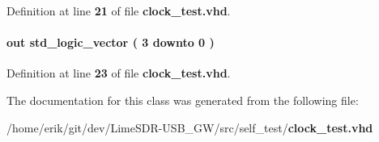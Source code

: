 Definition at line {\bf 21} of file {\bf clock\+\_\+test.\+vhd}.

\paragraph[{test\+\_\+rez}]{ {\bfseries \textcolor{keywordflow}{out}\textcolor{vhdlchar}{ }} {\bfseries \textcolor{comment}{std\+\_\+logic\+\_\+vector}\textcolor{vhdlchar}{ }\textcolor{vhdlchar}{(}\textcolor{vhdlchar}{ }\textcolor{vhdlchar}{ } \textcolor{vhdldigit}{3} \textcolor{vhdlchar}{ }\textcolor{keywordflow}{downto}\textcolor{vhdlchar}{ }\textcolor{vhdlchar}{ } \textcolor{vhdldigit}{0} \textcolor{vhdlchar}{ }\textcolor{vhdlchar}{)}\textcolor{vhdlchar}{ }} \hspace{0.3cm}{\ttfamily [Port]}}\label{classclock__test_ab811e0af67f47ce9b7a1daa7deb1657c}


Definition at line {\bf 23} of file {\bf clock\+\_\+test.\+vhd}.



The documentation for this class was generated from the following file\+:\begin{DoxyCompactItemize}
\item 
/home/erik/git/dev/\+Lime\+S\+D\+R-\/\+U\+S\+B\+\_\+\+G\+W/src/self\+\_\+test/{\bf clock\+\_\+test.\+vhd}\end{DoxyCompactItemize}

